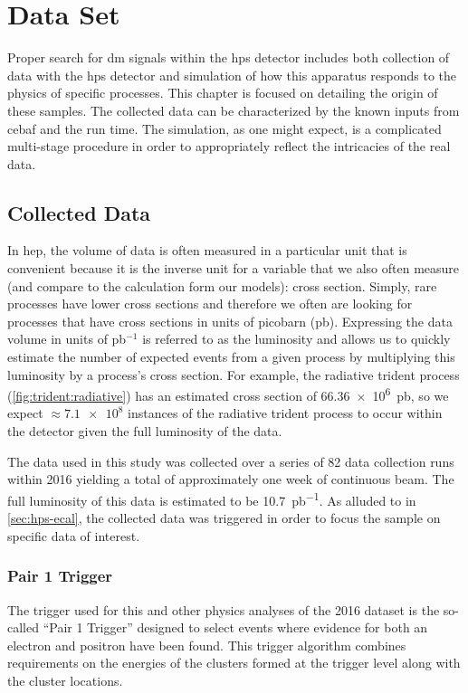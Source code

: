 \chapter{Data Set}
\label{chapter:hps:dataset}

Proper search for \ac{dm} signals within the \ac{hps} detector includes both collection of data
with the \ac{hps} detector and simulation of how this apparatus responds to the physics of specific
processes. This chapter is focused on detailing the origin of these samples. The collected data can
be characterized by the known inputs from \ac{cebaf} and the run time. The simulation, as one might
expect, is a complicated multi-stage procedure in order to appropriately reflect the intricacies of
the real data.

\section{Collected Data} \label{sec:hps:data}
In \ac{hep}, the volume of data is often measured in a particular unit that is convenient
because it is the inverse unit for a variable that we also often measure (and compare to
the calculation form our models): cross section.
Simply, rare processes have lower cross sections and therefore we often are looking for
processes that have cross sections in units of picobarn (pb).
Expressing the data volume in units of pb$^{-1}$ is referred to as the luminosity and
allows us to quickly estimate the number of expected events from a given process by multiplying
this luminosity by a process's cross section.
For example, the radiative trident process (\cref{fig:trident:radiative}) has an estimated
cross section of \qty{66.36e6}{pb}, so we expect $\approx\num{7.1e8}$ instances
of the radiative trident process to occur within the detector given the full luminosity of the data.

The data used in this study was collected over a series of 82 data collection runs within 2016
yielding a total of approximately one week of continuous beam.
The full luminosity of this data is estimated to be \qty{10.7}{pb^{-1}}.
As alluded to in \cref{sec:hps-ecal}, the collected data was triggered in order to focus the sample on
specific data of interest.

\subsection{Pair 1 Trigger} \label{sec:hps:data:trigger}
The trigger used for this and other physics analyses of the 2016 dataset is the so-called ``Pair 1 Trigger''
designed to select events where evidence for both an electron and positron have been found.
This trigger algorithm combines requirements on the energies of the clusters formed at the trigger
level along with the cluster locations.

